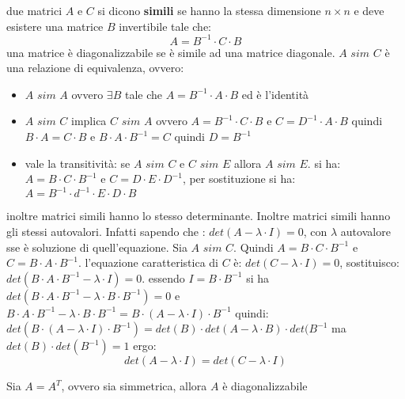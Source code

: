 \documentclass[a4paper,12pt, oneside]{book}
\begin{document}
\begin{definizione}
	due matrici $A$ e $C$ si dicono \textbf{simili} se hanno la stessa dimensione $n\times n$ e deve esistere una matrice $B$ invertibile tale che:
	$$A=B^{-1}\cdot C \cdot B$$
	una matrice è diagonalizzabile se è simile ad una matrice diagonale.
	$A \,\,sim\,\, C$ è una relazione di equivalenza, ovvero:
	\begin{itemize}
		\item $A\,\, sim \,\, A$ ovvero $\exists B$ tale che $A=B^{-1}\cdot A\cdot B$ ed è l'identità
		\item $A\,\, sim \,\, C$ implica $C\,\, sim \,\, A$ ovvero $A=B^{-1}\cdot C\cdot B$ e $C=D^{-1}\cdot A\cdot B$ quindi $B\cdot A=C\cdot B$ e $B\cdot A\cdot B^{-1}=C$ quindi $D=B^{-1}$
		\item vale la transitività: se $A\,\, sim \,\, C$ e $C\,\, sim \,\, E$ allora $A\,\, sim \,\, E$. si ha: $A=B\cdot C\cdot B^{-1}$ e $C=D\cdot E\cdot D^{-1}$, per sostituzione si ha: $A=B^{-1}\cdot d^{-1}\cdot E\cdot D\cdot B$
	\end{itemize}
	inoltre matrici simili hanno lo stesso determinante. Inoltre matrici simili hanno gli stessi autovalori. Infatti sapendo che : $det(A-\lambda\cdot I)=0$, con $\lambda$ autovalore sse è soluzione di quell'equazione. Sia $A\,\, sim \,\, C$. Quindi $A=B\cdot C\cdot B^{-1}$ e $C=B\cdot A\cdot B^{-1}$. l'equazione caratteristica di $C$ è: $det(C-\lambda\cdot I)=0$, sostituisco: $det(B\cdot A\cdot B^{-1}-\lambda\cdot I)=0$. essendo $I=B\cdot B^{-1}$ si ha $det(B\cdot A\cdot B^{-1}-\lambda\cdot B\cdot B^{-1})=0$ e $B\cdot A\cdot B^{-1}-\lambda\cdot B\cdot B^{-1}=B\cdot (A-\lambda\cdot I)\cdot B^{-1}$ quindi: $det(B\cdot (A-\lambda\cdot I)\cdot B^{-1})=det(B)\cdot det(A-\lambda\cdot B)\cdot det(B^{-1}$ ma $det(B)\cdot det(B^{-1})=1$ ergo:
	$$det(A-\lambda\cdot I)=det(C-\lambda\cdot I)$$
\end{definizione}
\begin{teorema}
	Sia $A=A^T$, ovvero sia simmetrica, allora $A$ è diagonalizzabile
\end{teorema}
\end{document}

